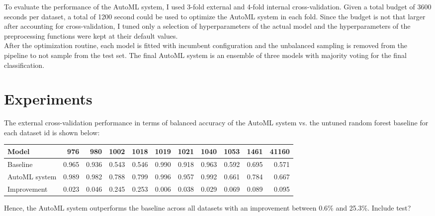 \documentclass[11pt]{article}
\begin{document}
To evaluate the performance of the AutoML system, I used 3-fold external and 4-fold internal cross-validation. Given a total budget of 3600 seconds per dataset, a total of 1200 second could be used to optimize the AutoML system in each fold. Since the budget is not that larger after accounting for cross-validation, I tuned only a selection of hyperparameters of the actual model and the hyperparameters of the preprocessing functions were kept at their default values. \\

After the optimization routine, each model is fitted with incumbent configuration and the unbalanced sampling is removed from the pipeline to not sample from the test set. The final AutoML system is an ensemble of three models with majority voting for the final classification. 

\section{Experiments}

The external cross-validation performance in terms of balanced accuracy of the AutoML system vs. the untuned random forest baseline for each dataset id is shown below:

\begin{table}[H]
\begin{tabular}{lrrrrrrrrrr}
\toprule
        Model &   976 &   980 &  1002 &  1018 &  1019 &  1021 &  1040 &  1053 &  1461 &  41160 \\
\midrule
     Baseline & 0.965 & 0.936 & 0.543 & 0.546 & 0.990 & 0.918 & 0.963 & 0.592 & 0.695 &  0.571 \\
AutoML system & 0.989 & 0.982 & 0.788 & 0.799 & 0.996 & 0.957 & 0.992 & 0.661 & 0.784 &  0.667 \\
\midrule
  Improvement & 0.023 & 0.046 & 0.245 & 0.253 & 0.006 & 0.038 & 0.029 & 0.069 & 0.089 &  0.095 \\
\bottomrule
\end{tabular}
\end{table}

Hence, the AutoML system outperforms the baseline across all datasets with an improvement between 0.6\% and 25.3\%. Include test? \\
\end{document}

